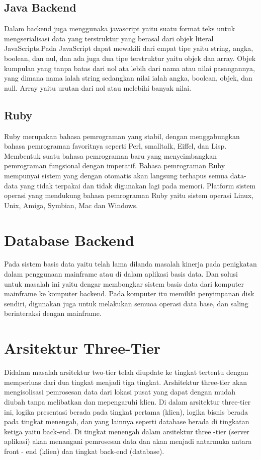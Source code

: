 \subsection{Java Backend}
Dalam backend juga menggunaka javascript yaitu suatu format teks untuk mengserialisasi data yang terstruktur yang berasal dari objek literal JavaScripts.Pada JavaScript dapat mewakili dari empat tipe yaitu string, angka, boolean, dan nul, dan ada juga dua tipe terstruktur yaitu objek dan array. Objek kumpulan yang tanpa batas dari nol ata lebih dari nama atau nilai pasangannya, yang dimana nama ialah string sedangkan nilai ialah angka, boolean, objek, dan null. Array yaitu urutan dari nol atau melebihi banyak nilai.

\subsection{Ruby}
Ruby merupakan bahasa pemrograman yang stabil, dengan menggabungkan bahasa pemrograman favoritnya seperti Perl, smalltalk, Eiffel, dan Lisp.
Membentuk suatu bahasa pemrograman baru yang menyeimbangkan pemrograman fungsional dengan imperatif.
Bahasa pemrograman Ruby mempunyai sistem yang dengan otomatis akan langsung terhapus semua data-data yang tidak terpakai dan tidak digunakan lagi pada memori. 
Platform sistem operasi yang mendukung bahasa pemrograman Ruby yaitu sistem operasi Linux, Unix, Amiga, Symbian, Mac dan Windows.

\section{Database Backend}
Pada sistem basis data yaitu telah lama dilanda masalah kinerja pada penigkatan dalam penggunaan mainframe atau di dalam aplikasi basis data. Dan solusi untuk masalah ini yaitu dengar membongkar sistem basis data dari komputer mainframe ke komputer backend. Pada komputer itu memiliki penyimpanan disk sendiri, digunakan juga untuk melakukan semuoa operasi data base, dan saling berinteraksi dengan mainframe.


\section{Arsitektur Three-Tier}
Didalam masalah arsitektur two-tier telah diupdate ke tingkat tertentu dengan memperluas dari dua tingkat menjadi tiga tingkat.
Arshitektur three-tier akan mengisolisasi pemrosesan data dari lokasi pusat yang dapat dengan mudah diubah tanpa melibatkan dan mepengaruhi klien. Di dalam arsitektur three-tier ini, logika presentasi berada pada tingkat pertama (klien), logika bisnis berada pada 
tingkat menengah, dan yang lainnya seperti database berada di tingkatan ketiga yaitu back-end. Di tingkat menengah dalam
arsitektur three -tier (server aplikasi) akan menangani pemrosesan data dan akan menjadi antarmuka antara front - end (klien) dan
tingkat back-end (database).


